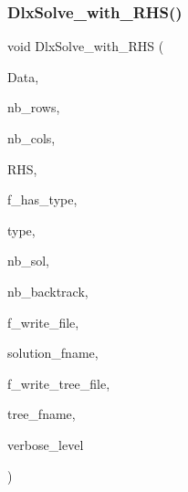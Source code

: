 \subsubsection{\texorpdfstring{Dlx\+Solve\+\_\+with\+\_\+\+R\+H\+S()}{DlxSolve\_with\_RHS()}}
{\footnotesize\ttfamily void Dlx\+Solve\+\_\+with\+\_\+\+R\+HS (\begin{DoxyParamCaption}\item[{\mbox{\hyperlink{galois_8h_a09fddde158a3a20bd2dcadb609de11dc}{I\+NT}} $\ast$}]{Data,  }\item[{\mbox{\hyperlink{galois_8h_a09fddde158a3a20bd2dcadb609de11dc}{I\+NT}}}]{nb\+\_\+rows,  }\item[{\mbox{\hyperlink{galois_8h_a09fddde158a3a20bd2dcadb609de11dc}{I\+NT}}}]{nb\+\_\+cols,  }\item[{\mbox{\hyperlink{galois_8h_a09fddde158a3a20bd2dcadb609de11dc}{I\+NT}} $\ast$}]{R\+HS,  }\item[{\mbox{\hyperlink{galois_8h_a09fddde158a3a20bd2dcadb609de11dc}{I\+NT}}}]{f\+\_\+has\+\_\+type,  }\item[{\mbox{\hyperlink{galois_8h_a331aa0f3283349b42f6bab83e017cdc1}{diophant\+\_\+equation\+\_\+type}} $\ast$}]{type,  }\item[{\mbox{\hyperlink{galois_8h_a09fddde158a3a20bd2dcadb609de11dc}{I\+NT}} \&}]{nb\+\_\+sol,  }\item[{\mbox{\hyperlink{galois_8h_a09fddde158a3a20bd2dcadb609de11dc}{I\+NT}} \&}]{nb\+\_\+backtrack,  }\item[{\mbox{\hyperlink{galois_8h_a09fddde158a3a20bd2dcadb609de11dc}{I\+NT}}}]{f\+\_\+write\+\_\+file,  }\item[{const \mbox{\hyperlink{galois_8h_ab6cc7b4aeb6ea31aba2b3fbfc83ff5e6}{B\+Y\+TE}} $\ast$}]{solution\+\_\+fname,  }\item[{\mbox{\hyperlink{galois_8h_a09fddde158a3a20bd2dcadb609de11dc}{I\+NT}}}]{f\+\_\+write\+\_\+tree\+\_\+file,  }\item[{const \mbox{\hyperlink{galois_8h_ab6cc7b4aeb6ea31aba2b3fbfc83ff5e6}{B\+Y\+TE}} $\ast$}]{tree\+\_\+fname,  }\item[{\mbox{\hyperlink{galois_8h_a09fddde158a3a20bd2dcadb609de11dc}{I\+NT}}}]{verbose\+\_\+level }\end{DoxyParamCaption})}

\mbox{\label{_l_i_b_2_g_a_l_o_i_s_2dlx_8_c_a000422ca8994e7b327aaa5d5dca6b0a3}} 
